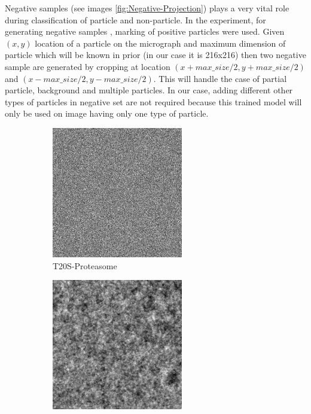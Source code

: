 \documentclass[twoside]{iitbreport}
\begin{document}
Negative samples (see images \ref{fig:Negative-Projection}) plays a very vital role during classification  of particle and non-particle. In the experiment, for generating negative samples \cite{chen2012detection}, marking of positive particles were used. Given $(x,y)$ location of a particle on the micrograph and maximum dimension of particle  which will be known in prior (in our case it is 216x216) then two negative sample are generated by cropping at location $(x+ max\_size/2, y + max\_size/2)$ and $(x- max\_size/2, y - max\_size/2)$. This will handle the case of partial particle, background and multiple particles. In our case, adding different other types of particles in negative set are not required because this trained model will only be used on image having only one type of particle. 

\begin{figure}[h]
\centering
\begin{subfigure}{.5\textwidth}
\centering
\includegraphics[width=0.5\linewidth]{neg-EM-10025.png}
\captionsetup{justification=centering}
\caption{ T20S-Proteasome }
\end{subfigure} 
\begin{subfigure}{.48\textwidth}
\centering
\includegraphics[width=0.5\linewidth]{neg-EM-10028.png}

\end{subfigure}
\end{figure}
\end{document}
